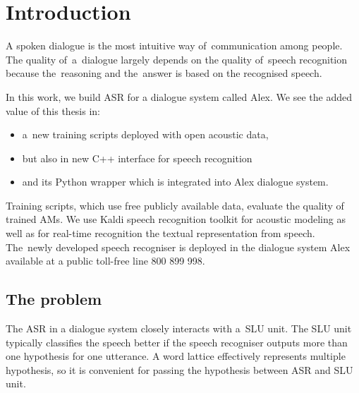 \chapter{Introduction}
\label{cha:intro}

A spoken dialogue is the most intuitive way of~communication among people. 
The quality of~a~dialogue largely depends on the quality of~speech recognition because the~reasoning and the~answer is based on the recognised speech. 

In this work, we build \acl{ASR} for a dialogue system called Alex. 
We see the added value of this thesis in:
\begin{itemize}
    \item a~new training scripts deployed with open acoustic data\cite{korvas_2014}, 
    \item but also in new C++ interface for speech recognition 
    \item and its Python wrapper which is integrated into Alex dialogue system. 
\end{itemize}
Training scripts, which use free publicly available data, evaluate the quality of trained \aclp{AM}.
We use Kaldi speech recognition toolkit\cite{povey2011kaldi} for acoustic modeling as well as for real-time recognition the textual representation from speech.
The~newly developed speech recogniser is deployed in the dialogue system Alex available at a public toll-free line 800 899 998. 


\section{The problem} 
\label{sec:problem}

The \ac{ASR} in a dialogue system closely interacts with a~\acl{SLU} unit.
The \ac{SLU} unit typically classifies the speech better if the speech recogniser outputs more than one hypothesis for one utterance. 
A word lattice effectively represents multiple hypothesis, so it is convenient for passing the hypothesis between \ac{ASR} and \ac{SLU} unit.

